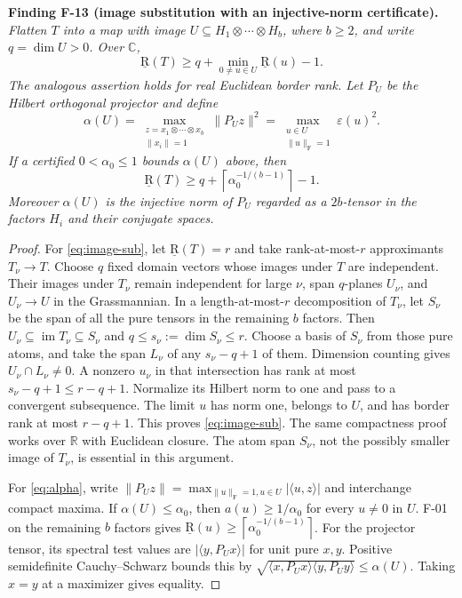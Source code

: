 \documentclass[11pt]{article}
\newcommand{\R}{\mathbb R}\newcommand{\C}{\mathbb C}
\newcommand{\BR}{\underline{\mathrm R}}\newcommand{\TR}{\mathrm R}
\newcommand{\HS}[1]{\lVert #1\rVert_{\mathrm F}}
\newcommand{\eps}{\varepsilon}
\newcommand{\ceil}[1]{\left\lceil#1\right\rceil}
\newenvironment{finding}[2]{\par\medskip\noindent\textbf{Finding #1 (#2).}\ \itshape}{\par\medskip}
\begin{document}
\begin{finding}{F-13}{image substitution with an injective-norm certificate}
Flatten $T$ into a map with image
$U\subseteq H_1\otimes\cdots\otimes H_b$, where $b\geq2$, and
write $q=\dim U>0$. Over $\C$,
\begin{equation}\label{eq:image-sub}
 \BR(T)\geq q+\min_{0\ne u\in U}\BR(u)-1.
\end{equation}
The analogous assertion holds for real Euclidean border rank.
Let $P_U$ be the Hilbert orthogonal projector and define
\begin{equation}\label{eq:alpha}
 \alpha(U)=\max_{\substack{z=x_1\otimes\cdots\otimes x_b\\\|x_i\|=1}}
                    \|P_Uz\|^2
           =\max_{\substack{u\in U\\\HS u=1}}\eps(u)^2.
\end{equation}
If a certified $0<\alpha_0\leq1$ bounds $\alpha(U)$ above, then
\begin{equation}\label{eq:image-norm}
 \BR(T)\geq q+\ceil{\alpha_0^{-1/(b-1)}}-1.
\end{equation}
Moreover $\alpha(U)$ is the injective norm of $P_U$ regarded as
a $2b$-tensor in the factors $H_i$ and their conjugate spaces.
\end{finding}
\begin{proof}
For \eqref{eq:image-sub}, let $\BR(T)=r$ and take rank-at-most-$r$
approximants $T_\nu\to T$. Choose $q$ fixed domain vectors whose
images under $T$ are independent. Their images under $T_\nu$
remain independent for large $\nu$, span $q$-planes $U_\nu$, and
$U_\nu\to U$ in the Grassmannian.
In a length-at-most-$r$ decomposition of $T_\nu$, let $S_\nu$
be the span of all the pure tensors in the remaining $b$ factors.
Then $U_\nu\subseteq\operatorname{im}T_\nu\subseteq S_\nu$ and
$q\leq s_\nu:=\dim S_\nu\leq r$.
Choose a basis of $S_\nu$ from those pure atoms, and take the span
$L_\nu$ of any $s_\nu-q+1$ of them. Dimension counting gives
$U_\nu\cap L_\nu\ne0$. A nonzero $u_\nu$ in that intersection
has rank at most $s_\nu-q+1\leq r-q+1$.
Normalize its Hilbert norm to one and pass to a convergent subsequence.
The limit $u$ has norm one, belongs to $U$, and has border rank
at most $r-q+1$. This proves \eqref{eq:image-sub}.
The same compactness proof works over $\R$ with Euclidean closure.
The atom span $S_\nu$, not the possibly smaller image of $T_\nu$,
is essential in this argument.

For \eqref{eq:alpha}, write
$\|P_Uz\|=\max_{\HS u=1,u\in U}|\langle u,z\rangle|$
and interchange compact maxima. If $\alpha(U)\leq\alpha_0$,
then $a(u)\geq1/\alpha_0$ for every $u\ne0$ in $U$.
F-01 on the remaining $b$ factors gives
$\BR(u)\geq\ceil{\alpha_0^{-1/(b-1)}}$.
For the projector tensor, its spectral test values are
$|\langle y,P_Ux\rangle|$ for unit pure $x,y$.
Positive semidefinite Cauchy--Schwarz bounds this by
$\sqrt{\langle x,P_Ux\rangle\langle y,P_Uy\rangle}\leq\alpha(U)$.
Taking $x=y$ at a maximizer gives equality.
\end{proof}
\end{document}
